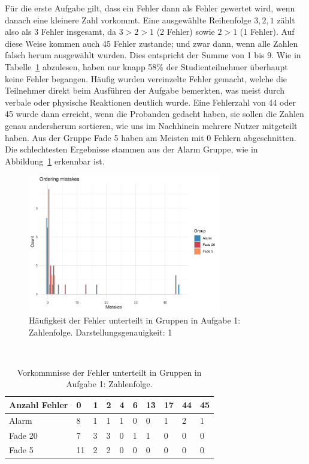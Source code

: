 Für die erste Aufgabe gilt, dass ein Fehler dann als Fehler gewertet wird, wenn danach eine kleinere Zahl vorkommt. Eine ausgewählte Reihenfolge $3, 2, 1$ zählt also als 3 Fehler insgesamt, da $3 > 2 > 1$ (2 Fehler) sowie $2 > 1$ (1 Fehler). Auf diese Weise kommen auch 45 Fehler zustande; und zwar dann, wenn alle Zahlen falsch herum ausgewählt wurden. Dies entspricht der Summe von 1 bis 9.
Wie in Tabelle~\ref{fig:orderingMistakeHistogram} abzulesen, haben nur knapp 58\% der Studienteilnehmer überhaupt keine Fehler begangen. Häufig wurden vereinzelte Fehler gemacht, welche die Teilnehmer direkt beim Ausführen der Aufgabe bemerkten, was meist durch verbale oder physische Reaktionen deutlich wurde. 
Eine Fehlerzahl von 44 oder 45 wurde dann erreicht, wenn die Probanden gedacht haben, sie sollen die Zahlen genau andersherum sortieren, wie uns im Nachhinein mehrere Nutzer mitgeteilt haben.
Aus der Gruppe Fade 5 haben am Meisten mit 0 Fehlern abgeschnitten. Die schlechtesten Ergebnisse stammen aus der Alarm Gruppe, wie in Abbildung~\ref{fig:orderingMistakeHistogram} erkennbar ist. 

\begin{figure}[H]
	\centering
	\includegraphics[width=0.75\textwidth]{./_StudyResults/orderingMisHist}
	\caption{Häufigkeit der Fehler unterteilt in Gruppen in Aufgabe 1: Zahlenfolge. Darstellungsgenauigkeit: 1}
	\label{fig:orderingMistakeHistogram}
\end{figure}

\begin{table}
	\caption{Vorkommnisse der Fehler unterteilt in Gruppen in Aufgabe 1: Zahlenfolge.}~\label{tab:orderingMistakeNumbers}
	
	\setlength\tabcolsep{3pt}
	\renewcommand{\arraystretch}{1.4}%
	\begin{tabularx}{\textwidth}{ | l | x | x | x | x | x | x | x | x | x | }
		\hline
		Anzahl Fehler & 0   & 1  & 2  & 4  & 6  & 13 & 17 & 44  & 45 \\ \hline\hline
		Alarm 	  & 8  & 1  & 1  & 1  & 0  & 0  & 1  &  2  & 1  \\ \hline
		Fade 20	  & 7  & 3  & 3  & 0  & 1  & 1  & 0  &  0  & 0  \\ \hline
		Fade 5	  & 11  & 2  & 2  & 0  & 0  & 0  & 0  &  0  & 0  \\ \hline
	\end{tabularx}
\end{table}

